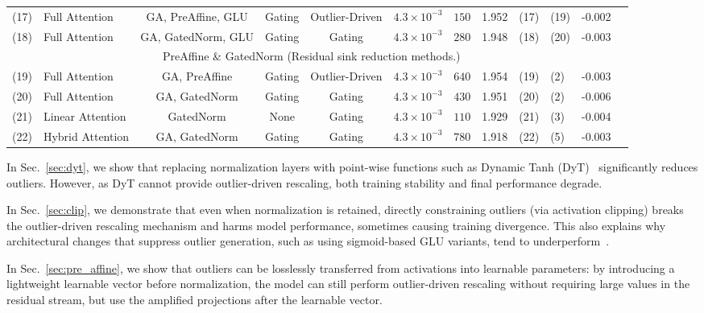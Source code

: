 \documentclass{article} %
\begin{document}
\begin{table}[t!]
{\begin{tabular}{clccccrccllc}
(17) & Full Attention & GA, PreAffine, GLU & Gating & Outlier-Driven & $4.3\times10^{-3}$ & \cellcolor{outlier2}$150$ & \cellcolor{loss6}1.952 & (17) & (19) & \cellcolor{gap_green2}-0.002 \\
(18) & Full Attention & GA, GatedNorm, GLU & Gating & Gating & $4.3\times10^{-3}$ & \cellcolor{outlier3}$280$ & \cellcolor{loss6}1.948 & (18) & (20) & \cellcolor{gap_green2}-0.003 \\
\midrule
\multicolumn{11}{c}{PreAffine \& GatedNorm (Residual sink reduction methods.)} \\
\midrule
(19) & Full Attention & GA, PreAffine & Gating & Outlier-Driven & $4.3\times10^{-3}$ & \cellcolor{outlier4}$640$ & \cellcolor{loss6}1.954 & (19) & (2) & \cellcolor{gap_green2}-0.003 \\
(20) & Full Attention & GA, GatedNorm & Gating & Gating & $4.3\times10^{-3}$ & \cellcolor{outlier4}$430$ & \cellcolor{loss6}1.951 & (20) & (2) & \cellcolor{gap_green3}-0.006 \\
(21) & Linear Attention & GatedNorm & None & Gating & $4.3\times10^{-3}$ & \cellcolor{outlier2}$110$ & \cellcolor{loss7}1.929 & (21) & (3) & \cellcolor{gap_green2}-0.004 \\
(22) & Hybrid Attention & GA, GatedNorm & Gating & Gating & $4.3\times10^{-3}$ & \cellcolor{outlier4}$780$ & \cellcolor{loss7}1.918 & (22) & (5) & \cellcolor{gap_green2}-0.003 \\
\bottomrule
\end{tabular}%
}
\vskip  -0.1in
\end{table}

In Sec.~\ref{sec:dyt}, we show that replacing normalization layers with point-wise functions such as Dynamic Tanh (DyT)~\citep{zhu2025transformers,chen2025stronger} significantly reduces outliers. 
However, as DyT cannot provide outlier-driven rescaling, both training stability and final performance degrade.  

In Sec.~\ref{sec:clip}, we demonstrate that even when normalization is retained, directly constraining outliers (via activation clipping) breaks the outlier-driven rescaling mechanism and harms model performance, sometimes causing training divergence. 
This also explains why architectural changes that suppress outlier generation, such as using sigmoid-based GLU variants, tend to underperform~\citep{shazeer2020glu}.  

In Sec.~\ref{sec:pre_affine}, we show that outliers can be losslessly transferred from activations into learnable parameters: by introducing a lightweight learnable vector before normalization, the model can still perform outlier-driven rescaling without requiring large values in the residual stream, but use the amplified projections after the learnable vector.  
\end{document}
